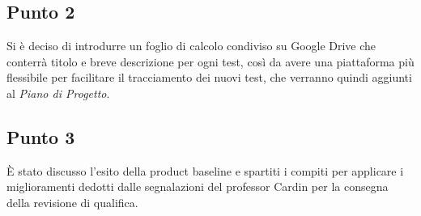     \subsection{Punto 2}
        Si è deciso di introdurre un foglio di calcolo condiviso su Google Drive che conterrà titolo e breve descrizione per ogni test, così da avere una piattaforma più flessibile per facilitare il tracciamento dei nuovi test, che verranno quindi aggiunti al \textit{Piano di Progetto}.
    \subsection{Punto 3}
        È stato discusso l'esito della product baseline e spartiti i compiti per applicare i miglioramenti dedotti dalle segnalazioni del professor Cardin per la consegna della revisione di qualifica.
